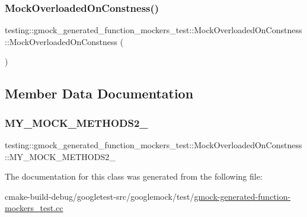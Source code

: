 \subsubsection{\texorpdfstring{MockOverloadedOnConstness()}{MockOverloadedOnConstness()}}
{\footnotesize\ttfamily testing\+::gmock\+\_\+generated\+\_\+function\+\_\+mockers\+\_\+test\+::\+Mock\+Overloaded\+On\+Constness\+::\+Mock\+Overloaded\+On\+Constness (\begin{DoxyParamCaption}{ }\end{DoxyParamCaption})\hspace{0.3cm}{\ttfamily [inline]}}



\subsection{Member Data Documentation}
\mbox{\label{classtesting_1_1gmock__generated__function__mockers__test_1_1MockOverloadedOnConstness_a3447041442c4ca64d597186e894b307d}} 
\subsubsection{\texorpdfstring{MY\_MOCK\_METHODS2\_}{MY\_MOCK\_METHODS2\_}}
{\footnotesize\ttfamily testing\+::gmock\+\_\+generated\+\_\+function\+\_\+mockers\+\_\+test\+::\+Mock\+Overloaded\+On\+Constness\+::\+M\+Y\+\_\+\+M\+O\+C\+K\+\_\+\+M\+E\+T\+H\+O\+D\+S2\+\_\+}



The documentation for this class was generated from the following file\+:\begin{DoxyCompactItemize}
\item 
cmake-\/build-\/debug/googletest-\/src/googlemock/test/\mbox{\hyperlink{gmock-generated-function-mockers__test_8cc}{gmock-\/generated-\/function-\/mockers\+\_\+test.\+cc}}\end{DoxyCompactItemize}

